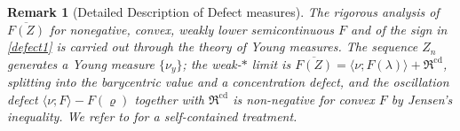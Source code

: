\documentclass[12pt,a4paper,twoside]{article}
\newcommand{\Ov}[1]{\overline{#1}}
\newcommand{\vr}{\varrho}
\newtheorem{rmk}{Remark}
\numberwithin{equation}{section}%
\newcommand{\tcbb}{\textcolor{black!30!blue}}
\begin{document}
%
%
%
\begin{rmk}[Detailed Description of Defect measures]%
	The rigorous analysis of $\Ov{F(Z)}$ for nonegative, convex, weakly lower semicontinuous $F$ and of the sign in \eqref{defect1} is carried out through the theory of Young measures. The sequence $Z_n$ generates a Young measure $\{\nu_y\}$; the weak-$*$ limit is $\Ov{F(Z)} = \langle\nu;F(\lambda)\rangle + \mathfrak R^{\mathrm{cd}}$, splitting into the barycentric value and a concentration defect, and the oscillation defect $\langle\nu;F\rangle - F(\vr)$ together with $\mathfrak R^{\mathrm{cd}}$ is non-negative for convex $F$ by Jensen's inequality. We refer to \cite[Chapter~1]{C2021} for a self-contained treatment. 
\end{rmk}
\end{document}
